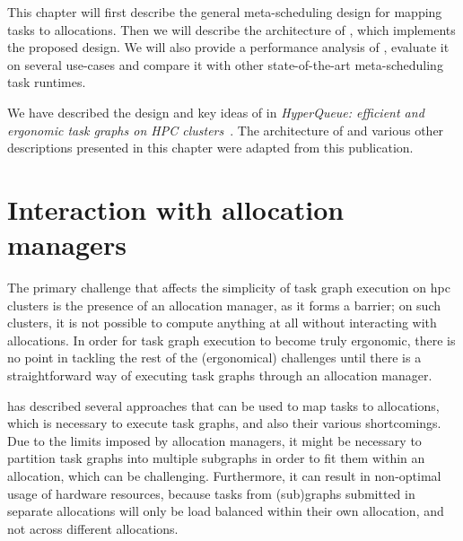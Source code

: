This chapter will first describe the general meta-scheduling design for mapping tasks to
allocations. Then we will describe the architecture of \hyperqueue{}, which implements
the proposed design. We will also provide a performance analysis of \hyperqueue{},
evaluate it on several use-cases and compare it with other state-of-the-art meta-scheduling task
runtimes.


We have described the design and key ideas of \hyperqueue{} in
\emph{HyperQueue: efficient and ergonomic task graphs on HPC clusters}~\cite{hyperqueue}. The architecture of \hyperqueue{} and
various other descriptions presented in this chapter were adapted from this publication.


\section{Interaction with allocation managers}
The primary challenge that affects the simplicity of task graph execution on
\gls{hpc} clusters is the presence of an allocation manager, as it forms a barrier;
on such clusters, it is not possible to compute anything at all without interacting with
allocations. In order for task graph execution to become truly ergonomic, there is no point in
tackling the rest of the (ergonomical) challenges until there is a straightforward way of executing
task graphs through an allocation manager.

 has described several approaches that can be used to map tasks to
allocations, which is necessary to execute task graphs, and also their various shortcomings. Due to
the limits imposed by allocation managers, it might be necessary to partition task graphs into
multiple subgraphs in order to fit them within an allocation, which can be challenging.
Furthermore, it can result in non-optimal usage of hardware resources, because tasks from
(sub)graphs submitted in separate allocations will only be load balanced within their own
allocation, and not across different allocations.

